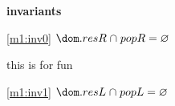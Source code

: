 \textbf{invariants}
\begin{block}
\item[ \eqref{m1:inv0} ]$\dom.resR \binter popR = \emptyset $ %
  \item   \begin{block}
    \item   this is for fun
  \end{block}
\item[ \eqref{m1:inv1} ]$\dom.resL \binter popL = \emptyset $ %
\end{block}
